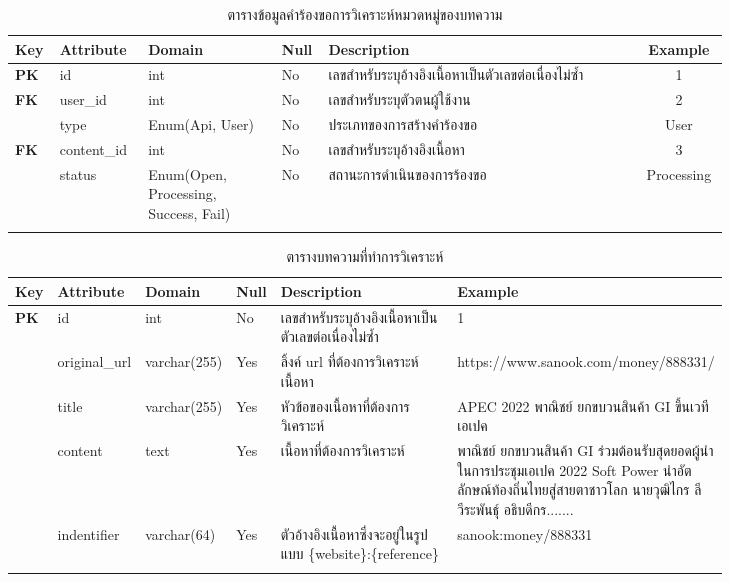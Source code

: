 \documentclass[12pt,oneside,openright,a4paper]{cpe-thai-project}
\begin{document}
\begin{itemize}
\begin{longtable}{p{0.03\linewidth}|p{0.1\linewidth}|p{0.17\linewidth}|m{0.03\linewidth}|p{0.4\linewidth}|p{0.1\linewidth}}
  \caption{ตารางข้อมูลคำร้องขอการวิเคราะห์หมวดหมู่ของบทความ}\label{tbl:ticket}  \\
  \hhline{======} 
  \textbf{Key} & \textbf{Attribute} & \textbf{Domain} & \textbf{Null} & \textbf{Description} &\multicolumn{1}{c}{\textbf{Example}}  \\ \hline
  \endfirsthead
  \endhead
  \textbf{PK} & id      & int         & No & เลขสำหรับระบุอ้างอิงเนื้อหาเป็นตัวเลขต่อเนื่องไม่ซ้ำ      & \multicolumn{1}{c}{1}          \\ \hline
  \textbf{FK} & user\_id & int         & No & เลขสำหรับระบุตัวตนผู้ใช้งาน                       & \multicolumn{1}{c}{2}     \\ \hline
  \textbf{ }   & type & Enum(Api, User)     & No & ประเภทของการสร้างคำร้องขอ                 & \multicolumn{1}{c}{User}        \\ \hline
  \textbf{FK} & content\_id & int         & No & เลขสำหรับระบุอ้างอิงเนื้อหา                       & \multicolumn{1}{c}{3}     \\ \hline
  \textbf{ }   & status & Enum(Open, Processing, Success, Fail)         & No & สถานะการดำเนินของการร้องขอ   & \multicolumn{1}{c}{Processing}     \\ 
  \hhline{======}
\end{longtable}

\begin{longtable}{p{0.03\linewidth}|p{0.1\linewidth}|p{0.1\linewidth}|m{0.03\linewidth}|p{0.27\linewidth}|p{0.3\linewidth}}
  \caption{ตารางบทความที่ทำการวิเคราะห์} \label{tbl:content}\\
  \hhline{======}
  \textbf{Key} & \textbf{Attribute} & \textbf{Domain} & \textbf{Null} & \textbf{Description} & \textbf{Example} \\ \hline
  \endfirsthead
  \endhead
  \textbf{PK} & id & int &  No & เลขสำหรับระบุอ้างอิงเนื้อหาเป็นตัวเลขต่อเนื่องไม่ซ้ำ & 1 \\\hline
  \textbf{} & original\_url & varchar(255) & Yes & ลิ้งค์ url ที่ต้องการวิเคราะห์เนื้อหา & https://www.sanook.com/money/888331/ \\\hline
  \textbf{} & title & varchar(255) & Yes & หัวข้อของเนื้อหาที่ต้องการวิเคราะห์ & APEC 2022 พาณิชย์ ยกขบวนสินค้า GI ขึ้นเวทีเอเปค \\ \hline
  \textbf{} & content & text & Yes & เนื้อหาที่ต้องการวิเคราะห์ & พาณิชย์ ยกขบวนสินค้า GI ร่วมต้อนรับสุดยอดผู้นำในการประชุมเอเปค 2022 Soft Power นำอัตลักษณ์ท้องถิ่นไทยสู่สายตาชาวโลก นายวุฒิไกร ลีวีระพันธุ์ อธิบดีกร....... \\ \hline
  \textbf{} & indentifier & varchar(64) & Yes & ตัวอ้างอิงเนื้อหาซึ่งจะอยู่ในรูปแบบ \{website\}:\{reference\} & sanook:money/888331 \\ 
  \hhline{======}
\end{longtable}


\end{itemize}
\end{document}
